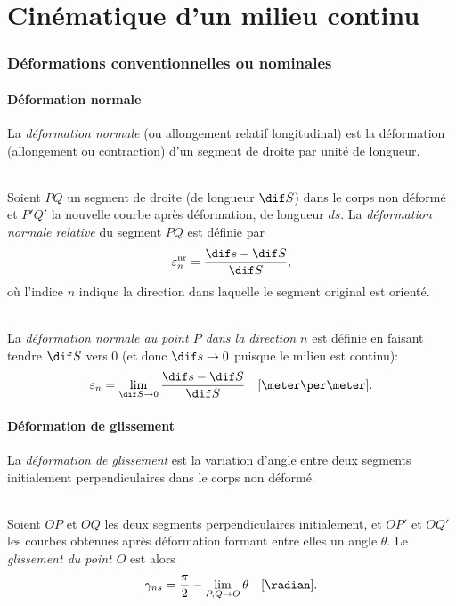 \part{Cinématique d'un milieu continu}
\section{Déformations conventionnelles ou nominales}
\subsection{Déformation normale}
La \emph{déformation normale} (ou allongement relatif longitudinal) est la déformation (allongement ou contraction) d'un segment de droite par unité de longueur.
\paragraph{}
Soient $PQ$ un segment de droite (de longueur $\dif S$) dans le corps non déformé et $P'Q'$ la nouvelle courbe après déformation, de longueur $ds$. La \emph{déformation normale relative} du segment $PQ$ est définie par
$$\varepsilon_n^{\text{nr}}=\frac{\dif s-\dif S}{\dif S},$$ où l'indice $n$ indique la direction dans laquelle le segment original est orienté.
\paragraph{}
La \emph{déformation normale au point $P$ dans la direction $n$} est définie en faisant tendre $\dif S$ vers 0 (et donc $\dif s \rightarrow 0$ puisque le milieu est continu):
$$\varepsilon_n=\lim_{\dif S \rightarrow 0}\frac{\dif s-\dif S}{\dif S} \quad [\meter\per\meter].$$

\subsection{Déformation de glissement}
La \emph{déformation de glissement} est la variation d'angle entre deux segments initialement perpendiculaires dans le corps non déformé.
\paragraph{}
Soient $OP$ et $OQ$ les deux segments perpendiculaires initialement, et $OP'$ et $OQ'$ les courbes obtenues après déformation formant entre elles un angle $\theta$. Le \emph{glissement du point $O$} est alors
$$\gamma_{ns}=\frac{\pi}{2}-\lim_{P,Q \rightarrow O}\theta \quad [\radian].$$


